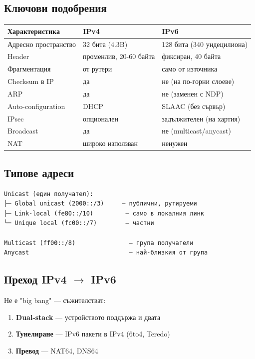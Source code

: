 \documentclass[12pt,a4paper]{article}
\begin{document}
\subsection{Ключови подобрения}

\begin{center}
\begin{tabular}{|l|l|l|}
\hline
\textbf{Характеристика} & \textbf{IPv4} & \textbf{IPv6} \\
\hline
Адресно пространство & 32 бита (4.3B) & 128 бита (340 ундецилиона) \\
\hline
Header & променлив, 20-60 байта & фиксиран, 40 байта \\
\hline
Фрагментация & от рутери & само от източника \\
\hline
Checksum в IP & да & не (на по-горни слоеве) \\
\hline
ARP & да & не (заменен с NDP) \\
\hline
Auto-configuration & DHCP & SLAAC (без сървър) \\
\hline
IPsec & опционален & задължителен (на хартия) \\
\hline
Broadcast & да & не (multicast/anycast) \\
\hline
NAT & широко използван & ненужен \\
\hline
\end{tabular}
\end{center}

\subsection{Типове адреси}

\begin{lstlisting}
Unicast (един получател):
├─ Global unicast (2000::/3)     — публични, рутируеми
├─ Link-local (fe80::/10)         — само в локалния линк
└─ Unique local (fc00::/7)        — частни

Multicast (ff00::/8)               — група получатели
Anycast                            — най-близкия от група
\end{lstlisting}

\subsection{Преход IPv4 $\rightarrow$ IPv6}

Не е "big bang" — съжителстват:

\begin{enumerate}
    \item \textbf{Dual-stack} — устройството поддържа и двата
    \item \textbf{Тунелиране} — IPv6 пакети в IPv4 (6to4, Teredo)
    \item \textbf{Превод} — NAT64, DNS64
\end{enumerate}
\end{document}
